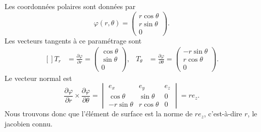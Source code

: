 \begin{example}
	Les coordonnées polaires sont données par
	\begin{equation}
		\varphi(r,\theta)=\begin{pmatrix}
			r\cos\theta \\
			r\sin\theta \\
			0
		\end{pmatrix}.
	\end{equation}
	Les vecteurs tangents à ce paramétrage sont
	\begin{equation}
		\begin{aligned}[]
			T_r & =\frac{ \partial \varphi }{ \partial r }=\begin{pmatrix}
				                                               \cos\theta \\
				                                               \sin\theta \\
				                                               0
			                                               \end{pmatrix}, & T_{\theta} & =\frac{ \partial \varphi }{ \partial \theta }=\begin{pmatrix}
				                                                                                                                           -r\sin\theta \\
				                                                                                                                           r\cos\theta  \\
				                                                                                                                           0
			                                                                                                                           \end{pmatrix}.
		\end{aligned}
	\end{equation}
	Le vecteur normal est
	\begin{equation}
		\frac{ \partial \varphi }{ \partial r }\times\frac{ \partial \varphi }{ \partial \theta }=\begin{vmatrix}
			e_x          & e_y         & e_z \\
			\cos\theta   & \sin\theta  & 0   \\
			-r\sin\theta & r\cos\theta & 0
		\end{vmatrix}=re_z.
	\end{equation}
	Nous trouvons donc que l'élément de surface est la norme de \( re_z\), c'est-à-dire \( r\), le jacobien connu.
\end{example}

